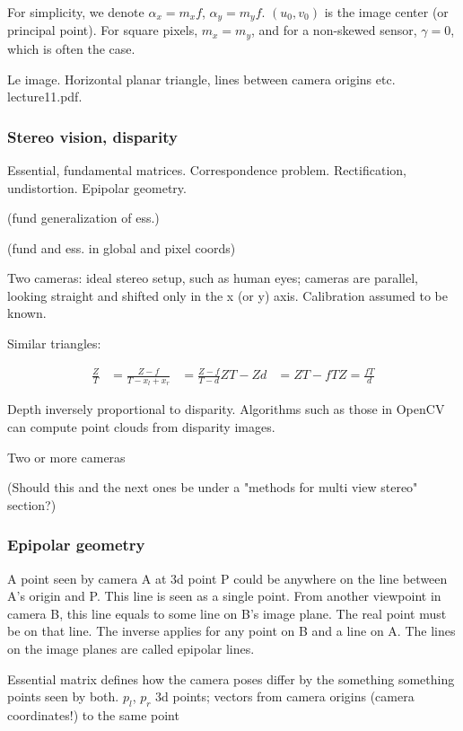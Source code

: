 For simplicity, we denote $\alpha_x = m_x f$, $\alpha_y = m_y f$. $(u_0, v_0)$ is the image center (or principal point). For square pixels, $m_x = m_y$, and for a non-skewed sensor, $\gamma = 0$, which is often the case.

Le image. Horizontal planar triangle, lines between camera origins etc. lecture11.pdf.

\subsubsection{Stereo vision, disparity}

Essential, fundamental matrices. Correspondence problem. Rectification, undistortion. Epipolar geometry.

(fund generalization of ess.)

(fund and ess. in global and pixel coords)

Two cameras: ideal stereo setup, such as human eyes; cameras are parallel, looking straight and shifted only in the x (or y) axis. Calibration assumed to be known.

Similar triangles:

\begin{align}
	\frac{Z}{T} &= \frac{Z-f}{T - x_l + x_r} &= \frac{Z-f}{T - d}
	ZT - Zd &= ZT - fT
	Z = \frac{fT}{d}
\end{align}


Depth inversely proportional to disparity. Algorithms such as those in OpenCV can compute point clouds from disparity images.

Two or more cameras

(Should this and the next ones be under a "methods for multi view stereo" section?)

\subsubsection{Epipolar geometry}

A point seen by camera A at 3d point P could be anywhere on the line between A's origin and P.
This line is seen as a single point.
From another viewpoint in camera B, this line equals to some line on B's image plane.
The real point must be on that line.
The inverse applies for any point on B and a line on A.
The lines on the image planes are called epipolar lines.


Essential matrix defines how the camera poses differ by the something something points seen by both. $p_l$, $p_r$ 3d points; vectors from camera origins (camera coordinates!) to the same point

